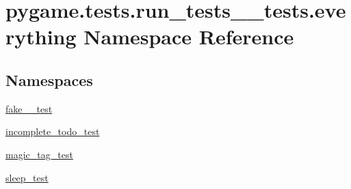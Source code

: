 \hypertarget{namespacepygame_1_1tests_1_1run__tests____tests_1_1everything}{}\section{pygame.\+tests.\+run\+\_\+tests\+\_\+\+\_\+tests.\+everything Namespace Reference}
\label{namespacepygame_1_1tests_1_1run__tests____tests_1_1everything}
\subsection*{Namespaces}
\begin{DoxyCompactItemize}
\item 
 \hyperlink{namespacepygame_1_1tests_1_1run__tests____tests_1_1everything_1_1fake__2__test}{fake\+\_\+\_\+test}
\item 
 \hyperlink{namespacepygame_1_1tests_1_1run__tests____tests_1_1everything_1_1incomplete__todo__test}{incomplete\+\_\+todo\+\_\+test}
\item 
 \hyperlink{namespacepygame_1_1tests_1_1run__tests____tests_1_1everything_1_1magic__tag__test}{magic\+\_\+tag\+\_\+test}
\item 
 \hyperlink{namespacepygame_1_1tests_1_1run__tests____tests_1_1everything_1_1sleep__test}{sleep\+\_\+test}
\end{DoxyCompactItemize}

